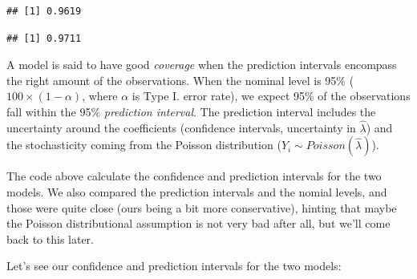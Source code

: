 \documentclass[12pt,]{book}
\newenvironment{Shaded}{\begin{snugshade}}{\end{snugshade}}
\newcommand{\DataTypeTok}[1]{\textcolor[rgb]{0.13,0.29,0.53}{#1}}
\newcommand{\DecValTok}[1]{\textcolor[rgb]{0.00,0.00,0.81}{#1}}
\newcommand{\KeywordTok}[1]{\textcolor[rgb]{0.13,0.29,0.53}{\textbf{#1}}}
\newcommand{\NormalTok}[1]{#1}
\newcommand{\OperatorTok}[1]{\textcolor[rgb]{0.81,0.36,0.00}{\textbf{#1}}}
\newcommand{\StringTok}[1]{\textcolor[rgb]{0.31,0.60,0.02}{#1}}
\begin{document}
\begin{verbatim}
## [1] 0.9619
\end{verbatim}

\begin{Shaded}
\end{Shaded}

\begin{verbatim}
## [1] 0.9711
\end{verbatim}

A model is said to have good \emph{coverage} when the prediction intervals
encompass the right amount of the observations. When the nominal level is 95\% (\(100 \times (1-\alpha)\),
where \(\alpha\) is Type I. error rate),
we expect 95\% of the observations fall within the 95\% \emph{prediction interval}.
The prediction interval includes the uncertainty around the coefficients
(confidence intervals, uncertainty in \(\hat{\lambda}\)) and the stochasticity coming from the
Poisson distribution (\(Y_i \sim Poisson(\hat{\lambda})\)).

The code above calculate the confidence and prediction intervals for the two models.
We also compared the prediction intervals and the nomial levels, and those were quite
close (ours being a bit more conservative), hinting that maybe the Poisson
distributional assumption is not very bad after all, but we'll come back to this later.

Let's see our confidence and prediction intervals for the two models:
\end{document}
